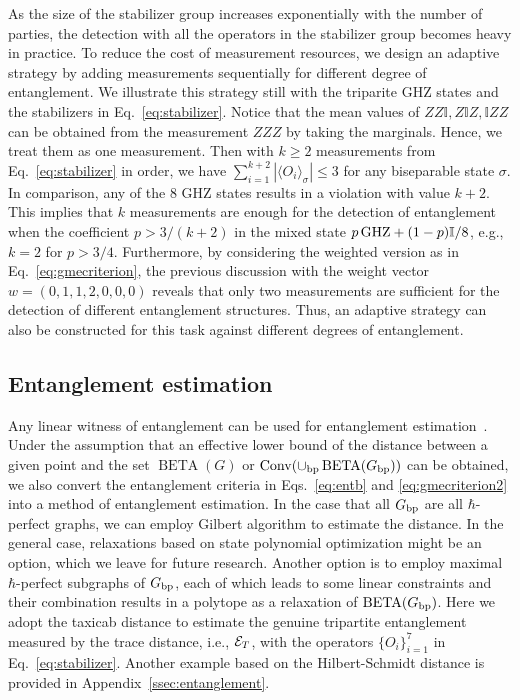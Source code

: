 \documentclass[
12pt,
prx,
aps,
reprint,
a4paper,
longbibliograph,
nofootinbib,
nobibnotes,
superscriptaddress
]{revtex4-2}
\theoremstyle{definition}
\def\id{\mathbb{I}}%
\def\conv{\mathrm{Conv}}
\def\be{\operatorname{BETA}}
\begin{document}
As the size of the stabilizer group increases exponentially with the number of parties, the detection with all the operators in the stabilizer group becomes heavy in practice. To reduce the cost of measurement resources, we design an adaptive strategy by adding measurements sequentially for different degree of entanglement. We illustrate this strategy still with the triparite GHZ states and the stabilizers in Eq.~\eqref{eq:stabilizer}. Notice that the mean values of $ZZ\id, Z\id Z, \id ZZ$ can be obtained from the measurement $ZZZ$ by taking the marginals. Hence, we treat them as one measurement. Then with $k\ge 2$ measurements from Eq.~\eqref{eq:stabilizer} in order, we have $\sum_{i=1}^{k+2} |\langle O_i\rangle_{\sigma}| \le 3$ for any biseparable state $\sigma$. In comparison, any of the $8$ GHZ states results in a violation with value $k+2$. This implies that  $k$ measurements are enough for the detection of entanglement when the coefficient $p > 3/(k+2)$ in the mixed state $p\, {\rm GHZ} + (1-p) \id/8$, e.g., $k=2$ for $p>3/4$. Furthermore, by considering the weighted version as in Eq.~\eqref{eq:gmecriterion}, the previous discussion with the weight vector $w=(0,1,1,2,0,0,0)$ reveals that only two measurements are sufficient for the detection of different entanglement structures. Thus, an adaptive strategy can also be constructed for this task against different degrees of entanglement.

\subsection{Entanglement estimation}
Any linear witness of entanglement can be used for entanglement estimation~\cite{sun2024bounding}. Under the assumption that an effective lower bound of the distance between a given point and the set $\be(G)$ or $\conv(\cup_{\rm bp}\be(G_{\rm bp}))$ can be obtained,
 we also convert the entanglement criteria in Eqs.~\eqref{eq:entb} and \eqref{eq:gmecriterion2} into a method of entanglement estimation.
In the case that all $G_{\rm bp}$ are all $\hbar$-perfect graphs, we can employ Gilbert algorithm to estimate the distance. In the general case, relaxations based on state polynomial optimization might be an option, which we leave for future research.
Another option is to employ maximal $\hbar$-perfect subgraphs of $G_{\rm bp}$, each of which leads to some linear constraints and their combination results in a polytope as a relaxation of $\be(G_{\rm bp})$.
Here we adopt the taxicab distance to estimate the genuine tripartite entanglement measured by the trace distance, i.e., ${\cal E}_T$, with the operators $\{O_i\}_{i=1}^7$ in Eq.~\eqref{eq:stabilizer}. Another example based on the Hilbert-Schmidt distance is provided in Appendix~\ref{ssec:entanglement}.
\end{document}
